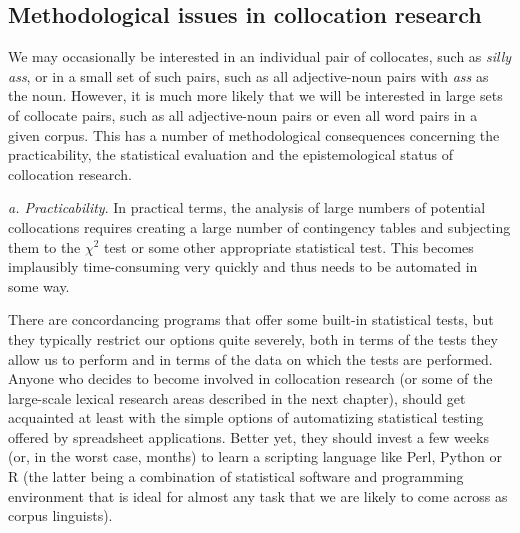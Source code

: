 \subsection{Methodological issues in collocation research}
\label{sec:methodologicalissuesincollocationresearch}

We may occasionally be interested in an individual pair of collocates,  such as \textit{silly ass}, or in a small set of such pairs, such as all adjective\hyp{}noun  pairs with \textit{ass} as the noun. However, it is much more likely that we will be interested in large sets of collocate pairs, such as all adjective\hyp{}noun  pairs or even all word pairs in a given corpus. This has a number of methodological consequences concerning the practicability, the statistical evaluation and the epistemological  status of collocation  research.

\textit{a. Practicability}. In practical terms, the analysis of large numbers of potential collocations  requires creating a large number of contingency  tables and subjecting them to the $\chi^2$  test or some other appropriate statistical test. This becomes implausibly time\hyp{}consuming very quickly and thus needs to be automated in some way.

There are concordancing  programs that offer some built\hyp{}in statistical tests, but they typically restrict our options quite severely, both in terms of the tests they allow us to perform and in terms of the data on which the tests are performed. Anyone who decides to become involved in collocation  research (or some of the large\hyp{}scale lexical research areas described in the next chapter), should get acquainted at least with the simple options of automatizing statistical testing offered by spreadsheet applications. Better yet, they should invest a few weeks (or, in the worst case, months) to learn a scripting language like Perl, Python or R (the latter being a combination of statistical software and programming environment that is ideal for almost any task that we are likely to come across as corpus linguists).

